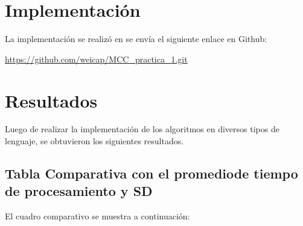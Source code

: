 \documentclass{article}
\begin{document}
\section{Implementación}
La implementación se realizó en 
se envía el siguiente enlace en Github:

\url{https://github.com/weicap/MCC_practica_1.git}

\section{Resultados}
Luego de realizar la implementación de los algoritmos en diversos tipos de lenguaje, se obtuvieron los siguientes resultados.
\subsection{Tabla Comparativa con el promediode tiempo de procesamiento y SD}
El cuadro comparativo se muestra a continuación:
\end{document}
